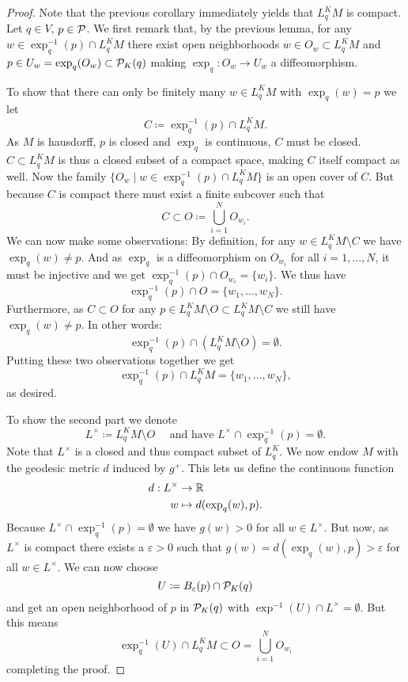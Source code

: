 \begin{proof}
    Note that the previous corollary immediately yields that $L^K_qM$ is compact.
    Let $q\in V$, $p\in {\mathcal{P}}$. We first remark that, by the previous lemma, for any $w\in \exp^{-1}_q(p) \cap L^K_qM$ there exist open neighborhoods $w\in O_w\subset L^K_qM$ and $p\in U_w=\exp_q(O_w)\subset {\mathcal{P}}_K(q)$ making $\exp_q:O_w\to U_w$ a diffeomorphism.

    To show that there can only be finitely many $w\in L^K_qM$ with $\exp_q(w)=p$ we let
    \[
        C\coloneqq \exp_q^{-1}(p)\cap L^K_qM.
    \] 
    As $M$ is hausdorff, ${p}$ is closed and $\exp_q$ is continuous, $C$ must be closed. $C\subset L^K_qM$ is thus a closed subset of a compact space, making $C$ itself compact as well. Now the family $\{O_w \mid w\in \exp^{-1}_q(p)\cap L^K_qM\}$ is an open cover of $C$. But because $C$ is compact there must exist a finite subcover such that 
    \[
        C\subset O\coloneqq  \bigcup_{i=1}^N O_{w_i}.
    \]
    We can now make some observations: By definition, for any $w\in L^K_qM\setminus C$ we have $\exp_q(w)\neq p$. And as $\exp_q$ is a diffeomorphism on $O_{w_i}$ for all $i=1,\dots, N$, it must be injective and we get $\exp^{-1}_q(p)\cap O_{w_i}=\{w_i\}$. We thus have 
    \[
        \exp_q^{-1}(p) \cap O = \{w_1,\dots, w_N\}.
    \]
    Furthermore, as $C\subset O$ for any $p\in L^K_qM\setminus O \subset L^K_qM \setminus C$ we still have $\exp_q(w)\neq p$. In other words: 
    \[
        \exp_q^{-1}(p)\cap (L^K_qM\setminus O)=\emptyset.
    \]
    Putting these two observations together we get 
    \[
        \exp_q^{-1}(p)\cap L^K_qM = \{w_1,\dots, w_N\},
    \]
    as desired.

    To show the second part we denote
    \[
        L^\times \coloneqq  L^K_qM \setminus O \quad \text{ and have } L^\times \cap \exp^{-1}_q(p) = \emptyset.
    \]
    Note that $L^\times$ is a closed and thus compact subset of $L^K_q$. We now endow $M$ with the geodesic metric $d$ induced by $g^+$. 
    This lets us define the continuous function 
    \begin{align*}
        d:L^\times &\to \mathbb{R}\\
        w &\mapsto d(\exp_q(w),p).
    \end{align*}
    Because $L^\times \cap \exp^{-1}_q(p) = \emptyset$ we have $g(w)>0$ for all $w\in L^\times$. But now, as $L^\times$ is compact there exists a $\varepsilon>0$ such that $g(w)=d(\exp_q(w),p)>\varepsilon$ for all $w\in L^\times$. We can now choose
    \[
        U \coloneqq  B_\varepsilon(p) \cap {\mathcal{P}}_K(q)
    \] and get an open neighborhood of $p$ in ${\mathcal{P}}_K(q)$ with $\exp^{-1}(U)\cap L^\times = \emptyset$. But this means 
    \[
        \exp^{-1}_q(U) \cap L^K_qM \subset O = \bigcup_{i=1}^N O_{w_i}
    \]
    completing the proof.
\end{proof}

